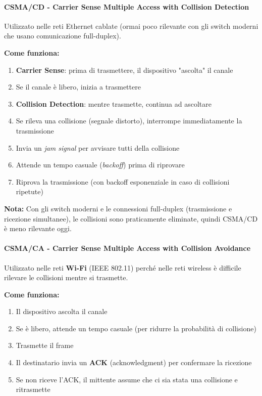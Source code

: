 \documentclass[12pt,a4paper]{article}
\begin{document}
\paragraph{CSMA/CD - Carrier Sense Multiple Access with Collision Detection}

Utilizzato nelle reti Ethernet cablate (ormai poco rilevante con gli switch moderni che usano comunicazione full-duplex).

\textbf{Come funziona:}
\begin{enumerate}
    \item \textbf{Carrier Sense}: prima di trasmettere, il dispositivo "ascolta" il canale
    \item Se il canale è libero, inizia a trasmettere
    \item \textbf{Collision Detection}: mentre trasmette, continua ad ascoltare
    \item Se rileva una collisione (segnale distorto), interrompe immediatamente la trasmissione
    \item Invia un \textit{jam signal} per avvisare tutti della collisione
    \item Attende un tempo casuale (\textit{backoff}) prima di riprovare
    \item Riprova la trasmissione (con backoff esponenziale in caso di collisioni ripetute)
\end{enumerate}

\textbf{Nota:} Con gli switch moderni e le connessioni full-duplex (trasmissione e ricezione simultanee), le collisioni sono praticamente eliminate, quindi CSMA/CD è meno rilevante oggi.

\paragraph{CSMA/CA - Carrier Sense Multiple Access with Collision Avoidance}

Utilizzato nelle reti \textbf{Wi-Fi} (IEEE 802.11) perché nelle reti wireless è difficile rilevare le collisioni mentre si trasmette.

\textbf{Come funziona:}
\begin{enumerate}
    \item Il dispositivo ascolta il canale
    \item Se è libero, attende un tempo casuale (per ridurre la probabilità di collisione)
    \item Trasmette il frame
    \item Il destinatario invia un \textbf{ACK} (acknowledgment) per confermare la ricezione
    \item Se non riceve l'ACK, il mittente assume che ci sia stata una collisione e ritrasmette
\end{enumerate}
\end{document}
